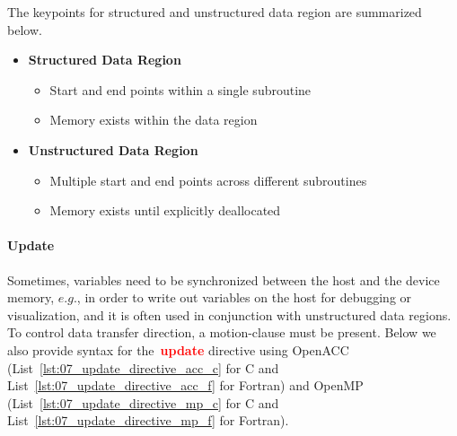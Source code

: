 \par
The keypoints for structured and unstructured data region are summarized below.
\begin{itemize}
    \item \textbf{Structured Data Region}
    \begin{itemize}
        \item Start and end points within a single subroutine
        \item Memory exists within the data region
    \end{itemize}
    \item \textbf{Unstructured Data Region}
    \begin{itemize}
        \item Multiple start and end points across different subroutines
        \item Memory exists until explicitly deallocated
    \end{itemize}
\end{itemize}


\paragraph{Update}
Sometimes, variables need to be synchronized between the host and the device memory, $e.g.$, in order to write out variables on the host for debugging or visualization, and it is often used in conjunction with unstructured data regions.
To control data transfer direction, a motion-clause must be present.
Below we also provide syntax for the~\textbf{\textcolor{red}{update}} directive using OpenACC (List~\ref{lst:07_update_directive_acc_c} for C and List~\ref{lst:07_update_directive_acc_f} for Fortran) and OpenMP (List~\ref{lst:07_update_directive_mp_c} for C and List~\ref{lst:07_update_directive_mp_f} for Fortran).











